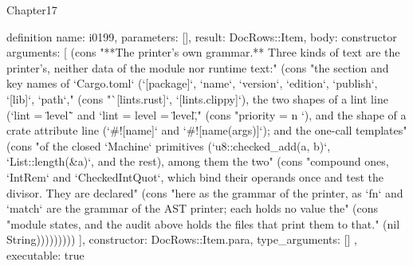 \begin{lexlean}{Chapter17}
\begin{semanticmodule}
definition{
  name: i0199,
  parameters: [],
  result: DocRows::Item,
  body: constructor{
    arguments: [
      (cons "**The printer's own grammar.** Three kinds of text are the printer's, neither data of the module nor runtime text:" (cons "the section and key names of `Cargo.toml` (`[package]`, `name`, `version`, `edition`, `publish`, `[lib]`, `path`," (cons "`[lints.rust]`, `[lints.clippy]`), the two shapes of a lint line (`lint = \"level\"` and `lint = { level = \"level\"," (cons "priority = n }`), and the shape of a crate attribute line (`#![name]` and `#![name(args)]`); and the one-call templates" (cons "of the closed `Machine` primitives (`u8::checked_add(a, b)`, `List::length(&a)`, and the rest), among them the two" (cons "compound ones, `IntRem` and `CheckedIntQuot`, which bind their operands once and test the divisor. They are declared" (cons "here as the grammar of the printer, as `fn` and `match` are the grammar of the AST printer; each holds no value the" (cons "module states, and the audit above holds the files that print them to that." (nil String)))))))))
    ],
    constructor: DocRows::Item.para,
    type_arguments: []
  },
  executable: true
}


\end{semanticmodule}
\end{lexlean}
